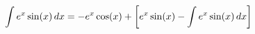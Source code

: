 \documentclass[preview]{standalone}
\begin{document}
\begin{align*}
\special{dvisvgm:raw <g id='unique000'>}\int e^x \sin(x) \, dx = -e^x \cos(x) + \left[ e^x \sin(x) - \int e^x \sin(x) \, dx \right]\special{dvisvgm:raw </g>}
\end{align*}
\end{document}
